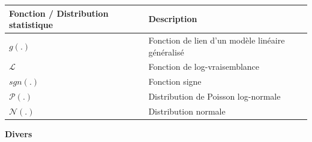 \documentclass[12pt,]{article}
\begin{document}
{\small
\begin{longtable}[l]{@{}ll@{}}
\toprule
\begin{minipage}[b]{0.41\columnwidth}\raggedright
Fonction / Distribution statistique\strut
\end{minipage} & \begin{minipage}[b]{0.53\columnwidth}\raggedright
Description\strut
\end{minipage}\tabularnewline
\midrule
\endhead
\begin{minipage}[t]{0.41\columnwidth}\raggedright
\(g(.)\)\strut
\end{minipage} & \begin{minipage}[t]{0.53\columnwidth}\raggedright
Fonction de lien d'un modèle linéaire généralisé\strut
\end{minipage}\tabularnewline
\begin{minipage}[t]{0.41\columnwidth}\raggedright
\(\mathcal L\)\strut
\end{minipage} & \begin{minipage}[t]{0.53\columnwidth}\raggedright
Fonction de log-vraisemblance\strut
\end{minipage}\tabularnewline
\begin{minipage}[t]{0.41\columnwidth}\raggedright
\(sgn(.)\)\strut
\end{minipage} & \begin{minipage}[t]{0.53\columnwidth}\raggedright
Fonction signe\strut
\end{minipage}\tabularnewline
\begin{minipage}[t]{0.41\columnwidth}\raggedright
\(\mathcal P(.)\)\strut
\end{minipage} & \begin{minipage}[t]{0.53\columnwidth}\raggedright
Distribution de Poisson log-normale\strut
\end{minipage}\tabularnewline
\begin{minipage}[t]{0.41\columnwidth}\raggedright
\(\mathcal N(.)\)\strut
\end{minipage} & \begin{minipage}[t]{0.53\columnwidth}\raggedright
Distribution normale\strut
\end{minipage}\tabularnewline
\bottomrule
\end{longtable}}\FloatBarrier


\textbf{Divers}
\end{document}
